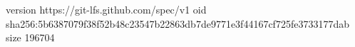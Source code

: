version https://git-lfs.github.com/spec/v1
oid sha256:5b6387079f38f52b48c23547b22863db7de9771e3f44167cf725fe3733177dab
size 196704
